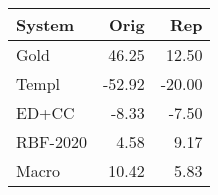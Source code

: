 \begin{tabular}{lrr}
\toprule
System & Orig & Rep \\
\midrule
Gold & 46.25 & 12.50 \\
Templ & -52.92 & -20.00 \\
ED+CC & -8.33 & -7.50 \\
RBF-2020 & 4.58 & 9.17 \\
Macro & 10.42 & 5.83 \\
\bottomrule
\end{tabular}
